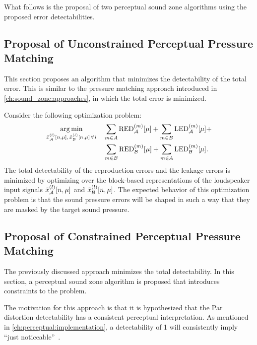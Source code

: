 What follows is the proposal of two perceptual sound zone algorithms using the proposed error detectabilities.

\subsection{Proposal of Unconstrained Perceptual Pressure Matching}
\label{ch:perceptual_sound_zone:perceptual_minimization:unconstrained}
This section proposes an algorithm that minimizes the detectability of the total error.
This is similar to the pressure matching approach introduced in \autoref{ch:sound_zone:approaches}, 
in which the total error is minimized.

Consider the following optimization problem:
\begin{equation}
    \begin{aligned}
    \operatorname*{arg\,min}_{\tilde{x}_{\mathcal{A}}^{(l)}[n,\mu],\,\tilde{x}_{\mathcal{B}}^{(l)}[n,\mu]\,\forall\,l}\quad 
       & \sum_{m\in A}\text{RED}_{\mathcal{A}}^{(m)}[\mu] + \sum_{m\in B}\text{LED}_{\mathcal{A}}^{(m)}[\mu] +\\
       & \sum_{m\in B}\text{RED}_{\mathcal{B}}^{(m)}[\mu] + \sum_{m\in A}\text{LED}_{\mathcal{B}}^{(m)}[\mu]
   .
    \end{aligned}
    \label{eq:perceptual_unconstrained}
\end{equation}
The total detectability of the reproduction errors and the leakage errors is minimized by optimizing over the 
block-based representations of the loudspeaker input signals $\tilde{x}_{\mathcal{A}}^{(l)}[n,\mu]$ and $\tilde{x}_{\mathcal{B}}^{(l)}[n,\mu]$.
The expected behavior of this optimization problem is that the sound pressure errors will be shaped in such a way that they are masked by the target sound pressure.

\subsection{Proposal of Constrained Perceptual Pressure Matching}
\label{ch:perceptual_sound_zone:perceptual_minimization:constrained}
The previously discussed approach minimizes the total detectability.
In this section, a perceptual sound zone algorithm is proposed that introduces constraints to the problem. 

The motivation for this approach is that it is hypothesized that the Par distortion detectability has a consistent perceptual interpretation.
As mentioned in \autoref{ch:perceptual:implementation}, a detectability of 1 will consistently imply ``just noticeable''~\cite{van2005perceptual}.

